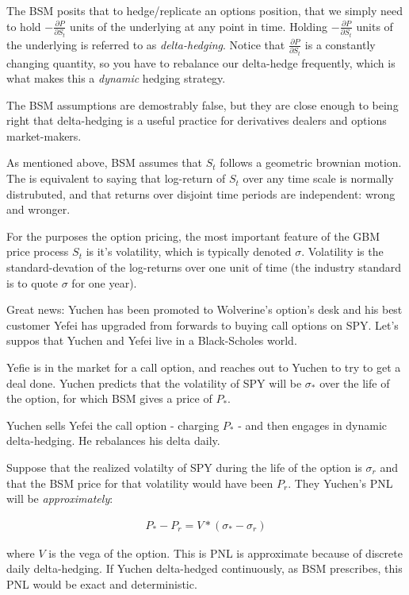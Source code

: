 \documentclass[11pt,]{krantz}
\begin{document}
The BSM posits that to hedge/replicate an options position, that we simply need to hold \(-\frac{\partial P}{\partial S_{t}}\) units of the underlying at any point in time. Holding \(-\frac{\partial P}{\partial S_{t}}\) units of the underlying is referred to as \emph{delta-hedging}. Notice that \(\frac{\partial P}{\partial S_{t}}\) is a constantly changing quantity, so you have to rebalance our delta-hedge frequently, which is what makes this a \emph{dynamic} hedging strategy.

The BSM assumptions are demostrably false, but they are close enough to being right that delta-hedging is a useful practice for derivatives dealers and options market-makers.

As mentioned above, BSM assumes that \(S_{t}\) follows a geometric brownian motion. The is equivalent to saying that log-return of \(S_{t}\) over any time scale is normally distrubuted, and that returns over disjoint time periods are independent: wrong and wronger.

For the purposes the option pricing, the most important feature of the GBM price process \(S_{t}\) is it's volatility, which is typically denoted \(\sigma\). Volatility is the standard-devation of the log-returns over one unit of time (the industry standard is to quote \(\sigma\) for one year).

Great news: Yuchen has been promoted to Wolverine's option's desk and his best customer Yefei has upgraded from forwards to buying call options on SPY. Let's suppos that Yuchen and Yefei live in a Black-Scholes world.

Yefie is in the market for a call option, and reaches out to Yuchen to try to get a deal done. Yuchen predicts that the volatility of SPY will be \(\sigma_{*}\) over the life of the option, for which BSM gives a price of \(P_{*}\).

Yuchen sells Yefei the call option - charging \(P_{*}\) - and then engages in dynamic delta-hedging. He rebalances his delta daily.

Suppose that the realized volatilty of SPY during the life of the option is \(\sigma_{r}\) and that the BSM price for that volatility would have been \(P_{r}\). They Yuchen's PNL will be \emph{approximately}:

\begin{align*}
P_{*} - P_{r} = V * (\sigma_{*} - \sigma_{r})   
\end{align*}

where \(V\) is the vega of the option. This is PNL is approximate because of discrete daily delta-hedging. If Yuchen delta-hedged continuously, as BSM prescribes, this PNL would be exact and deterministic.
\end{document}
